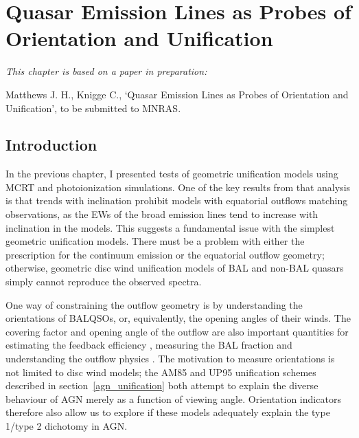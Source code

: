 \chapter{Quasar Emission Lines as Probes of Orientation and Unification}



{\em This chapter is based on a paper in preparation:

Matthews J. H., Knigge C., 
`Quasar Emission Lines as Probes of Orientation and Unification',
to be submitted to MNRAS.}


%
%
\maketitle

\section{Introduction}

In the previous chapter, I presented tests of geometric unification
models using MCRT and photoionization simulations. 
One of the key results from that analysis is that trends with
inclination prohibit models with equatorial outflows matching
observations, as the EWs of the broad emission lines tend
to increase with inclination in the models. 
This suggests a fundamental issue with the simplest geometric 
unification models. There must be a problem with either the prescription for the 
continuum emission or the equatorial outflow geometry; otherwise,
geometric disc wind unification models of BAL and non-BAL quasars simply 
cannot reproduce the observed spectra.

One way of constraining the outflow geometry 
is by understanding the orientations
of BALQSOs, or, equivalently, the opening angles of their winds.
The covering factor and opening angle of the outflow
are also important quantities for estimating the
feedback efficiency \citep[e.g.][]{borguet2012}, measuring
the BAL fraction \citep[e.g.][]{krolikvoit1998}
and understanding the outflow physics \citep[e.g.][]{proga2005}. 
The motivation to measure orientations is not limited to disc wind models; the
AM85 and UP95 unification schemes described in section~\ref{agn_unification}
both attempt to explain the diverse behaviour of AGN merely as a function of viewing 
angle. Orientation indicators therefore also allow us to explore if these models
adequately explain the type 1/type 2 dichotomy in AGN.

